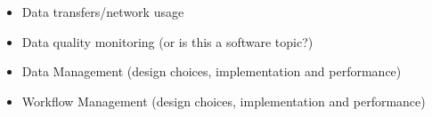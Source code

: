 \documentclass [draft,notitlepage] {article}
\begin{document}
\begin{itemize}


\item Data transfers/network usage





\item Data quality monitoring (or is this a software topic?)


\item Data Management (design choices, implementation and performance)


\item Workflow Management (design choices, implementation and performance)


\end{itemize}
\end{document}
